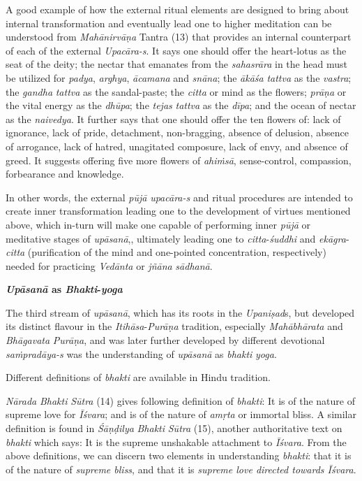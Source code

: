 A good example of how the external ritual elements are designed to bring about internal transformation and eventually lead one to higher meditation can be understood from \emph{Mahānirvāṇa} Tantra (13) that provides an internal counterpart of each of the external \emph{Upacāra-s}. It says one should offer the heart-lotus as the seat of the deity; the nectar that emanates from the \emph{sahasrāra} in the head must be utilized for \emph{padya}, \emph{arghya}, \emph{ācamana} and \emph{snāna}; the \emph{ākāśa} \emph{tattva} as the \emph{vastra}; the \emph{gandha} \emph{tattva} as the sandal-paste; the \emph{citta} or mind as the flowers; \emph{prāṇa} or the vital energy as the \emph{dhūpa}; the \emph{tejas} \emph{tattva} as the \emph{dīpa}; and the ocean of nectar as the \emph{naivedya}. It further says that one should offer the ten flowers of: lack of ignorance, lack of pride, detachment, non-bragging, absence of delusion, absence of arrogance, lack of hatred, unagitated composure, lack of envy, and absence of greed. It suggests offering five more flowers of \emph{ahiṁsā}, sense-control, compassion, forbearance and knowledge.

In other words, the external \emph{pūjā} \emph{upacāra-s} and ritual procedures are intended to create inner transformation leading one to the development of virtues mentioned above, which in-turn will make one capable of performing inner \emph{pūjā} or meditative stages of \emph{upāsanā},, ultimately leading one to \emph{citta}-\emph{śuddhi} and \emph{ekāgra}-\emph{citta} (purification of the mind and one-pointed concentration, respectively) needed for practicing \emph{Vedānta} or \emph{jñāna} \emph{sādhanā}.

\textbf{\emph{Upāsanā} as \emph{Bhakti}-\emph{yoga}}

The third stream of \emph{upāsanā}, which has its roots in the \emph{Upaniṣad}s, but developed its distinct flavour in the \emph{Itihāsa}-\emph{Purāṇa} tradition, especially \emph{Mahābhārata} and \emph{Bhāgavata} \emph{Purāṇa}, and was later further developed by different devotional \emph{saṁpradāya-s} was the understanding of \emph{upāsanā} as \emph{bhakti} \emph{yoga}.

Different definitions of \emph{bhakti} are available in Hindu tradition.

\emph{Nārada} \emph{Bhakti} \emph{Sūtra} (14) gives following definition of \emph{bhakti}: It is of the nature of supreme love for \emph{Īśvara}; and is of the nature of \emph{amṛta} or immortal bliss. A similar definition is found in \emph{Śāṇḍilya} \emph{Bhakti} \emph{Sūtra} (15), another authoritative text on \emph{bhakti} which says: It is the supreme unshakable attachment to \emph{Īśvara}. From the above definitions, we can discern two elements in understanding \emph{bhakti}: that it is of the nature of \emph{supreme bliss}, and that it is \emph{supreme love directed towards Īśvara}.

